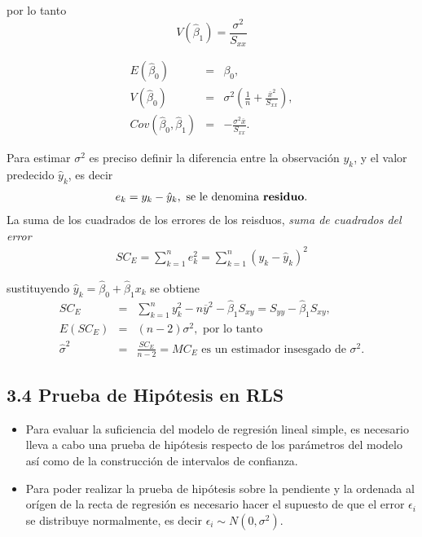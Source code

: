 por lo tanto
\begin{equation}\label{Varianza.Beta.1}
V\left(\hat{\beta}_{1}\right)=\frac{\sigma^{2}}{S_{xx}}
\end{equation}
\begin{Prop}
\begin{eqnarray*}
E\left(\hat{\beta}_{0}\right)&=&\beta_{0},\\
V\left(\hat{\beta}_{0}\right)&=&\sigma^{2}\left(\frac{1}{n}+\frac{\overline{x}^{2}}{S_{xx}}\right),\\
Cov\left(\hat{\beta}_{0},\hat{\beta}_{1}\right)&=&-\frac{\sigma^{2}\overline{x}}{S_{xx}}.
\end{eqnarray*}
\end{Prop}
Para estimar $\sigma^{2}$ es preciso definir la diferencia entre la observaci\'on $y_{k}$, y el valor predecido $\hat{y}_{k}$, es decir
\begin{eqnarray*}
e_{k}=y_{k}-\hat{y}_{k},\textrm{ se le denomina \textbf{residuo}.}
\end{eqnarray*}
La suma de los cuadrados de los errores de los reisduos, \textit{suma de cuadrados del error}
\begin{eqnarray}
SC_{E}=\sum_{k=1}^{n}e_{k}^{2}=\sum_{k=1}^{n}\left(y_{k}-\hat{y}_{k}\right)^{2}
\end{eqnarray}






sustituyendo $\hat{y}_{k}=\hat{\beta}_{0}+\hat{\beta}_{1}x_{k}$ se obtiene
\begin{eqnarray*}
SC_{E}&=&\sum_{k=1}^{n}y_{k}^{2}-n\overline{y}^{2}-\hat{\beta}_{1}S_{xy}=S_{yy}-\hat{\beta}_{1}S_{xy},\\
E\left(SC_{E}\right)&=&\left(n-2\right)\sigma^{2},\textrm{ por lo tanto}\\
\hat{\sigma}^{2}&=&\frac{SC_{E}}{n-2}=MC_{E}\textrm{ es un estimador insesgado de }\sigma^{2}.
\end{eqnarray*}



\subsection{3.4 Prueba de Hip\'otesis en RLS}




\begin{itemize}
\item Para evaluar la suficiencia del modelo de regresi\'on lineal simple, es necesario lleva a cabo una prueba de hip\'otesis respecto de los par\'ametros del modelo as\'i como de la construcci\'on de intervalos de confianza.

\item Para poder realizar la prueba de hip\'otesis sobre la pendiente y la ordenada al or\'igen de la recta de regresi\'on es necesario hacer el supuesto de que el error $\epsilon_{i}$ se distribuye normalmente, es decir $\epsilon_{i} \sim N\left(0,\sigma^{2}\right)$.

\end{itemize}






